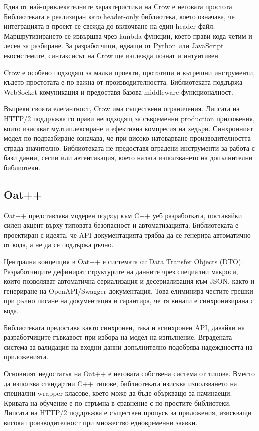 Една от най-привлекателните характеристики на Crow е неговата простота. Библиотеката е реализиран като header-only библиотека, което означава, че интеграцията в проект се свежда до включване на един header файл. Маршрутизирането се извършва чрез lambda функции, което прави кода четим и лесен за разбиране. За разработчици, идващи от Python или JavaScript екосистемите, синтаксисът на Crow ще изглежда познат и интуитивен.

Crow е особено подходящ за малки проекти, прототипи и вътрешни инструменти, където простотата е по-важна от производителността. Библиотеката поддържа WebSocket комуникация и предоставя базова middleware функционалност.

Въпреки своята елегантност, Crow има съществени ограничения. Липсата на HTTP/2 поддръжка го прави неподходящ за съвременни production приложения, които изискват мултиплексиране и ефективна компресия на хедъри. Синхронният модел по подразбиране означава, че при високо натоварване производителността страда значително. Библиотеката не предоставя вградени инструменти за работа с бази данни, сесии или автентикация, което налага използването на допълнителни библиотеки.

\subsection{Oat++}

Oat++ \cite{oatpp} представлява модерен подход към C++ уеб разработката, поставяйки силен акцент върху типовата безопасност и автоматизацията. Библиотеката е проектиран с идеята, че API документацията трябва да се генерира автоматично от кода, а не да се поддържа ръчно.

Централна концепция в Oat++ е системата от Data Transfer Objects (DTO). Разработчиците дефинират структурите на данните чрез специални макроси, които позволяват автоматична сериализация и десериализация към JSON, както и генериране на OpenAPI/Swagger документация. Това елиминира честите грешки при ръчно писане на документация и гарантира, че тя винаги е синхронизирана с кода.

Библиотеката предоставя както синхронен, така и асинхронен API, давайки на разработчиците гъвкавост при избора на модел на изпълнение. Вградената система за валидация на входни данни допълнително подобрява надеждността на приложенията.

Основният недостатък на Oat++ е неговата собствена система от типове. Вместо да използва стандартни C++ типове, библиотеката изисква използването на специални wrapper класове, което може да бъде объркващо за начинаещи. Кривата на обучение е по-стръмна в сравнение с по-простите библиотеки. Липсата на HTTP/2 поддръжка е съществен пропуск за приложения, изискващи висока производителност при множество едновременни заявки.


